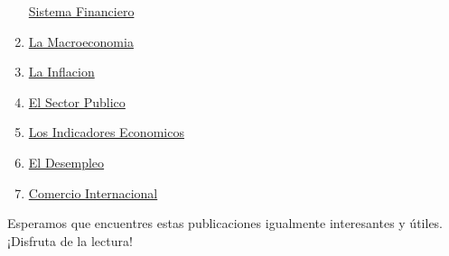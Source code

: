 \documentclass[
  jou,
  floatsintext,
  longtable,
  a4paper,
  nolmodern,
  notxfonts,
  notimes,
  colorlinks=true,linkcolor=blue,citecolor=blue,urlcolor=blue]{apa7}
\begin{document}
\begin{enumerate}
  \href{https://achalmaedison.netlify.app/teching/economia-preuniversitaria/2014-02-18-sistema-financiero/index.pdf}{}
  \href{https://achalmaedison.netlify.app/teching/economia-preuniversitaria/2014-02-18-sistema-financiero}{Sistema
  Financiero}
\item
  \href{https://achalmaedison.netlify.app/teching/economia-preuniversitaria/2014-02-25-la-macroeconomia/index.pdf}{}
  \href{https://achalmaedison.netlify.app/teching/economia-preuniversitaria/2014-02-25-la-macroeconomia}{La
  Macroeconomia}
\item
  \href{https://achalmaedison.netlify.app/teching/economia-preuniversitaria/2014-03-01-la-inflacion/index.pdf}{}
  \href{https://achalmaedison.netlify.app/teching/economia-preuniversitaria/2014-03-01-la-inflacion}{La
  Inflacion}
\item
  \href{https://achalmaedison.netlify.app/teching/economia-preuniversitaria/2014-03-08-el-sector-publico/index.pdf}{}
  \href{https://achalmaedison.netlify.app/teching/economia-preuniversitaria/2014-03-08-el-sector-publico}{El
  Sector Publico}
\item
  \href{https://achalmaedison.netlify.app/teching/economia-preuniversitaria/2014-03-15-los-indicadores-economicos/index.pdf}{}
  \href{https://achalmaedison.netlify.app/teching/economia-preuniversitaria/2014-03-15-los-indicadores-economicos}{Los
  Indicadores Economicos}
\item
  \href{https://achalmaedison.netlify.app/teching/economia-preuniversitaria/2014-03-22-el-desempleo/index.pdf}{}
  \href{https://achalmaedison.netlify.app/teching/economia-preuniversitaria/2014-03-22-el-desempleo}{El
  Desempleo}
\item
  \href{https://achalmaedison.netlify.app/teching/economia-preuniversitaria/2014-03-29-comercio-internacional/index.pdf}{}
  \href{https://achalmaedison.netlify.app/teching/economia-preuniversitaria/2014-03-29-comercio-internacional}{Comercio
  Internacional}
\end{enumerate}

Esperamos que encuentres estas publicaciones igualmente interesantes y
útiles. ¡Disfruta de la lectura!
\end{document}
